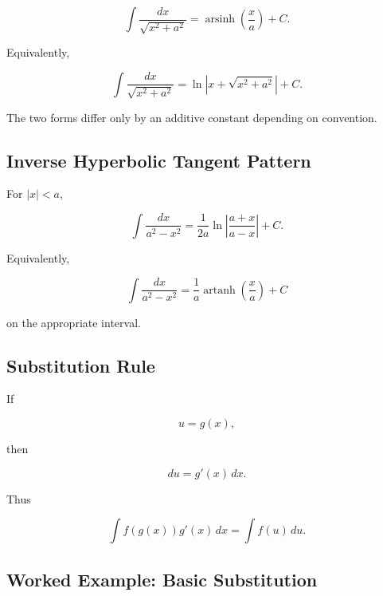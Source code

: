 \[
\boxed{
\int
\frac{
dx
}{
\sqrt{x^2+a^2}
}
=
\operatorname{arsinh}
\left(
\frac{x}{a}
\right)
+
C.
}
\]

Equivalently,

\[
\boxed{
\int
\frac{
dx
}{
\sqrt{x^2+a^2}
}
=
\ln
\left|
x+\sqrt{x^2+a^2}
\right|
+
C.
}
\]

The two forms differ only by an additive constant depending on convention.

\subsection{Inverse Hyperbolic Tangent Pattern}
\label{subsec:inverse-hyperbolic-tangent-integral}

For \(|x|<a\),

\[
\boxed{
\int
\frac{
dx
}{
a^2-x^2
}
=
\frac{
1
}{
2a
}
\ln
\left|
\frac{
a+x
}{
a-x
}
\right|
+
C.
}
\]

Equivalently,

\[
\boxed{
\int
\frac{
dx
}{
a^2-x^2
}
=
\frac1a
\operatorname{artanh}
\left(
\frac{x}{a}
\right)
+
C
}
\]

on the appropriate interval.

\subsection{Substitution Rule}
\label{subsec:substitution-integral-reference}

If

\[
u=g(x),
\]

then

\[
du
=
g'(x)\,dx.
\]

Thus

\[
\boxed{
\int
f(g(x))
g'(x)
\,dx
=
\int
f(u)\,du.
}
\]

\subsection{Worked Example: Basic Substitution}
\label{subsec:worked-basic-substitution}

